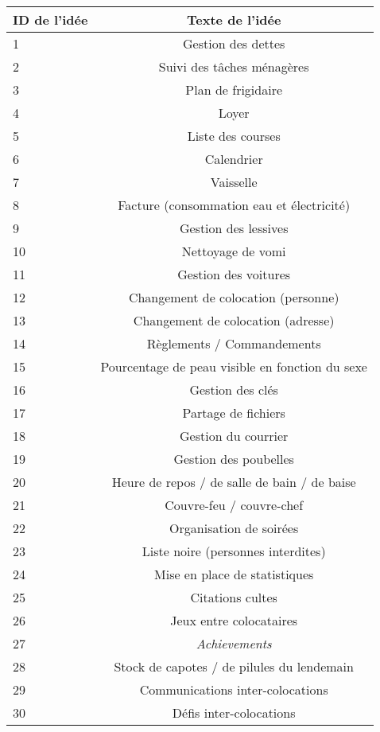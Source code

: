 \documentclass[a4paper, 12pt, french]{article}
\begin{document}
	\begin{longtable}{|l|c|}
 	\hline
  	ID de l'idée & Texte de l'idée \\ \hline
  	\hline
  	1 &  Gestion des dettes \\ \hline
  	2 &  Suivi des tâches ménagères \\ \hline
  	3 &  Plan de frigidaire \\ \hline
  	4 &  Loyer \\ \hline
  	5 &  Liste des courses \\ \hline
  	6 &  Calendrier \\ \hline
  	7 &  Vaisselle \\ \hline
  	8 &  Facture (consommation eau et électricité) \\ \hline
  	9 &  Gestion des lessives \\ \hline
  	10 &  Nettoyage de vomi \\ \hline
  	11 & Gestion des voitures \\ \hline
  	12 & Changement de colocation (personne) \\ \hline
  	13 & Changement de colocation (adresse) \\ \hline
  	14 & Règlements / Commandements \\ \hline
  	15 & Pourcentage de peau visible en fonction du sexe \\ \hline
  	16 & Gestion des clés \\ \hline
  	17 & Partage de fichiers \\ \hline
  	18 & Gestion du courrier \\ \hline
  	19 & Gestion des poubelles \\ \hline
  	20 & Heure de repos / de salle de bain / de baise \\ \hline
  	21 & Couvre-feu / couvre-chef \\ \hline
  	22 & Organisation de soirées \\ \hline
  	23 & Liste noire (personnes interdites) \\ \hline
  	24 & Mise en place de statistiques \\ \hline
  	25 & Citations cultes \\ \hline
  	26 & Jeux entre colocataires \\ \hline
  	27 & \textit{Achievements} \\ \hline
  	28 & Stock de capotes / de pilules du lendemain \\ \hline
  	29 & Communications inter-colocations \\ \hline
  	30 & Défis inter-colocations \\ \hline

\end{longtable}
\end{document}
